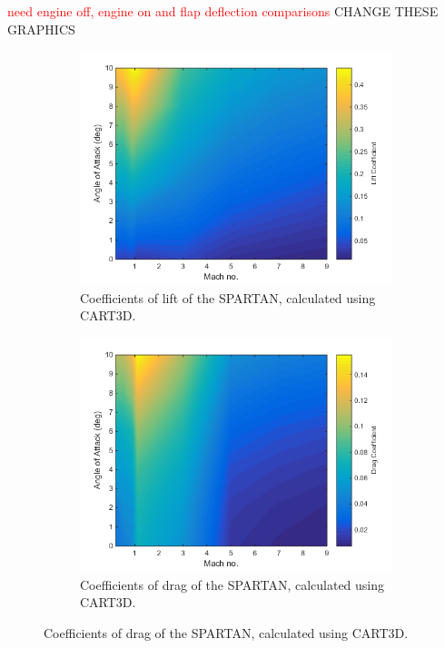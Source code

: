 \textcolor{red}{need engine off, engine on and flap deflection comparisons}
CHANGE THESE GRAPHICS

\begin{figure}
	\begin{subfigure}{.5\textwidth}
\centering
\includegraphics[width=0.99\linewidth]{figures/3_vehicle_design/Cl}
\caption{Coefficients of lift of the SPARTAN, calculated using CART3D.}
\label{fig:Cl}
\end{subfigure}
\begin{subfigure}{.5\textwidth}
\centering
\includegraphics[width=0.99\linewidth]{figures/3_vehicle_design/Cd}
\caption{Coefficients of drag of the SPARTAN, calculated using CART3D.}
\label{fig:Cd}
\end{subfigure}

\end{figure}

